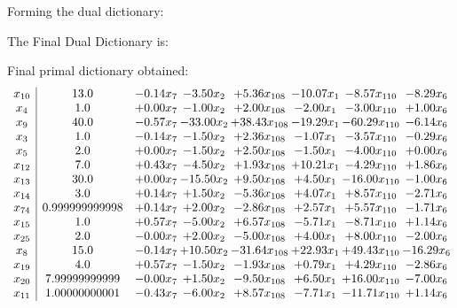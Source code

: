\documentclass[8pt]{article}
\begin{document}
Forming the dual dictionary:

The Final Dual Dictionary is: 

 Final primal dictionary obtained: 
\[\begin{array}{c| c c@{\hskip 2pt} c@{\hskip 2pt} c@{\hskip 2pt} c@{\hskip 2pt} c@{\hskip 2pt} c@{\hskip 2pt} }
 x_{10}   &  13.0 & -0.14 x_{7} & -3.50 x_{2} & +  5.36 x_{108} & -10.07 x_{1} & -8.57 x_{110} & -8.29 x_{6}\\
 x_{4}   &  1.0 & +  0.00 x_{7} & -1.00 x_{2} & +  2.00 x_{108} & -2.00 x_{1} & -3.00 x_{110} & +  1.00 x_{6}\\
 x_{9}   &  40.0 & -0.57 x_{7} & -33.00 x_{2} & + 38.43 x_{108} & -19.29 x_{1} & -60.29 x_{110} & -6.14 x_{6}\\
 x_{3}   &  1.0 & -0.14 x_{7} & -1.50 x_{2} & +  2.36 x_{108} & -1.07 x_{1} & -3.57 x_{110} & -0.29 x_{6}\\
 x_{5}   &  2.0 & +  0.00 x_{7} & -1.50 x_{2} & +  2.50 x_{108} & -1.50 x_{1} & -4.00 x_{110} & +  0.00 x_{6}\\
 x_{12}   &  7.0 & +  0.43 x_{7} & -4.50 x_{2} & +  1.93 x_{108} & + 10.21 x_{1} & -4.29 x_{110} & +  1.86 x_{6}\\
 x_{13}   &  30.0 & +  0.00 x_{7} & -15.50 x_{2} & +  9.50 x_{108} & +  4.50 x_{1} & -16.00 x_{110} & -1.00 x_{6}\\
 x_{14}   &  3.0 & +  0.14 x_{7} & +  1.50 x_{2} & -5.36 x_{108} & +  4.07 x_{1} & +  8.57 x_{110} & -2.71 x_{6}\\
 x_{74}   &  0.999999999998 & +  0.14 x_{7} & +  2.00 x_{2} & -2.86 x_{108} & +  2.57 x_{1} & +  5.57 x_{110} & -1.71 x_{6}\\
 x_{15}   &  1.0 & +  0.57 x_{7} & -5.00 x_{2} & +  6.57 x_{108} & -5.71 x_{1} & -8.71 x_{110} & +  1.14 x_{6}\\
 x_{25}   &  2.0 & -0.00 x_{7} & +  2.00 x_{2} & -5.00 x_{108} & +  4.00 x_{1} & +  8.00 x_{110} & -2.00 x_{6}\\
 x_{8}   &  15.0 & -0.14 x_{7} & + 10.50 x_{2} & -31.64 x_{108} & + 22.93 x_{1} & + 49.43 x_{110} & -16.29 x_{6}\\
 x_{19}   &  4.0 & +  0.57 x_{7} & -1.50 x_{2} & -1.93 x_{108} & +  0.79 x_{1} & +  4.29 x_{110} & -2.86 x_{6}\\
 x_{20}   &  7.99999999999 & -0.00 x_{7} & +  1.50 x_{2} & -9.50 x_{108} & +  6.50 x_{1} & + 16.00 x_{110} & -7.00 x_{6}\\
 x_{11}   &  1.00000000001 & -0.43 x_{7} & -6.00 x_{2} & +  8.57 x_{108} & -7.71 x_{1} & -11.71 x_{110} & +  1.14 x_{6}\\

\end{array}\]
\end{document}
